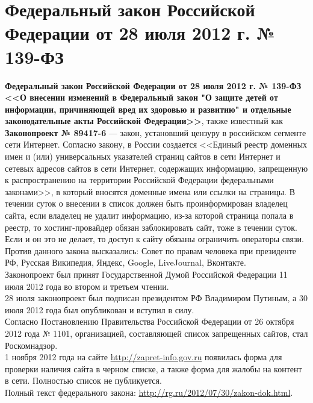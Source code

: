 {\section{Федеральный закон Российской Федерации от 28 июля 2012 г. № 139-ФЗ}
\textbf{Федеральный закон Российской Федерации от 28 июля 2012 г. № 139-ФЗ <<О внесении изменений в Федеральный закон "О защите детей от информации, причиняющей вред их здоровью и развитию" и отдельные законодательные акты Российской Федерации>>}, также известный как \textbf{Законопроект № 89417-6} --- закон, установший цензуру в российском сегменте сети Интернет. Согласно закону, в России создается <<Единый реестр доменных имен и (или) универсальных указателей страниц сайтов в сети Интернет и сетевых адресов сайтов в сети Интернет, содержащих информацию, запрещенную к распространению на территории Российской Федерации федеральными законами>>, в который вносятся доменные имена или ссылки на страницы. В течении суток о внесении в список должен быть проинформирован владелец сайта, если владелец не удалит информацию, из-за которой страница попала в реестр, то хостинг-провайдер обязан заблокировать сайт, тоже в течении суток. Если и он это не делает, то доступ к сайту обязаны ограничить операторы связи.\\
Против данного закона высказались: Совет по правам человека при президенте РФ\cite{139_presidentsoviet}, Русская Википедия\cite{139_wiki}, Яндекс\cite{139_yandex}, Google\cite{139_google}, LiveJournal\cite{139_livejournal}, Вконтакте\cite{139_vk}.\\
Законопроект был принят Государственной Думой Российской Федерации 11 июля 2012 года во втором и третьем чтении\cite{139_gosduma}.\\
28 июля законопроект был подписан президентом РФ Владимиром Путиным, а 30 июля 2012 года был опубликован и вступил в силу\cite{139_rg,139_blacklist}.\\
Согласно Постановлению Правительства Российской Федерации от 26 октября 2012 года № 1101, организацией, составляющей список запрещенных сайтов, стал Роскомнадзор\cite{139_1101}.\\
1 ноября 2012 года на сайте \url{http://zapret-info.gov.ru} появилась форма для проверки наличия сайта в черном списке, а также форма для жалобы на контент в сети. Полностью список не публикуется.\\
Полный текст федерального закона: \url{http://rg.ru/2012/07/30/zakon-dok.html}.
}
